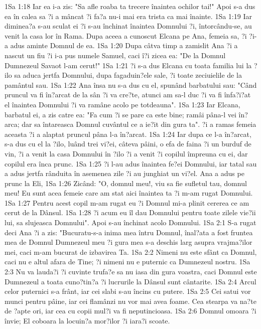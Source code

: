 1Sa 1:18  Iar ea i-a zis: "Sa afle roaba ta trecere înaintea ochilor tai!" Apoi s-a dus ea în calea sa ?i a mâncat ?i fa?a nu-i mai era trista ca mai înainte.
1Sa 1:19  Iar diminea?a s-au sculat ei ?i s-au închinat înaintea Domnului ?i, întorcându-se, au venit la casa lor în Rama. Dupa aceea a cunoscut Elcana pe Ana, femeia sa, ?i ?i-a adus aminte Domnul de ea.
1Sa 1:20  Dupa câtva timp a zamislit Ana ?i a nascut un fiu ?i i-a pus numele Samuel, caci î?i zicea ea: "De la Domnul Dumnezeul Savaot l-am cerut!"
1Sa 1:21  ?i s-a dus Elcana cu toata familia lui la ?ilo sa aduca jertfa Domnului, dupa fagaduin?ele sale, ?i toate zeciuielile de la pamântul sau.
1Sa 1:22  Ana însa nu s-a dus cu el, spunând barbatului sau: "Când pruncul va fi în?arcat de la sân ?i va cre?te, atunci am sa-l duc ?i va fi înfa?i?at el înaintea Domnului ?i va ramâne acolo pe totdeauna".
1Sa 1:23  Iar Elcana, barbatul ei, a zis catre ea: "Fa cum ?i se pare ca este bine; ramâi pâna-l vei în?arca; dar sa întareasca Domnul cuvântul ce a ie?it din gura ta". ?i a ramas femeia aceasta ?i a alaptat pruncul pâna l-a în?arcat.
1Sa 1:24  Iar dupa ce l-a în?arcat, s-a dus cu el la ?ilo, luând trei vi?ei, câteva pâini, o efa de faina ?i un burduf de vin, ?i a venit la casa Domnului în ?ilo ?i a venit ?i copilul împreuna cu ei, dar copilul era înca prunc.
1Sa 1:25  ?i l-au adus înaintea fe?ei Domnului, iar tatal sau a adus jertfa rânduita în asemenea zile ?i au junghiat un vi?el. Ana a adus pe prunc la Eli,
1Sa 1:26  Zicând: "O, domnul meu!, viu sa fie sufletul tau, domnul meu! Eu sunt acea femeie care am stat aici înaintea ta ?i m-am rugat Domnului.
1Sa 1:27  Pentru acest copil m-am rugat eu ?i Domnul mi-a plinit cererea ce am cerut de la Dânsul.
1Sa 1:28  ?i acum eu îl dau Domnului pentru toate zilele vie?ii lui, sa slujeasca Domnului". Apoi s-au închinat acolo Domnului.
1Sa 2:1  S-a rugat deci Ana ?i a zis: "Bucuratu-s-a inima mea întru Domnul, înal?ata a fost fruntea mea de Domnul Dumnezeul meu ?i gura mea s-a deschis larg asupra vrajma?ilor mei, caci m-am bucurat de izbavirea Ta.
1Sa 2:2  Nimeni nu este sfânt ca Domnul, caci nu e altul afara de Tine; ?i nimeni nu e puternic ca Dumnezeul nostru.
1Sa 2:3  Nu va lauda?i ?i cuvinte trufa?e sa nu iasa din gura voastra, caci Domnul este Dumnezeul a toata cuno?tin?a ?i lucrurile la Dânsul sunt cântarite.
1Sa 2:4  Arcul celor puternici s-a frânt, iar cei slabi s-au încins cu putere.
1Sa 2:5  Cei satui vor munci pentru pâine, iar cei flamânzi nu vor mai avea foame. Cea stearpa va na?te de ?apte ori, iar cea cu copii mul?i va fi neputincioasa.
1Sa 2:6  Domnul omoara ?i învie; El coboara la locuin?a mor?ilor ?i iara?i scoate.
